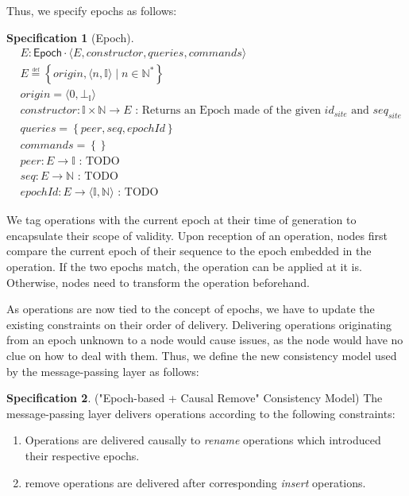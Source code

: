 \documentclass{article}
\newcommand{\commands}[1]{commands = \set{#1}}
\newcommand{\defeq}{\overset{\underset{\mathrm{def}}{}}{=}}
\newcommand{\fnspec}[3]{#1: #2 \text{ : #3}}
\newcommand{\queries}[1]{queries = \set{#1}}
\newcommand{\set}[1]{\left\{#1\right\}} %
\newcommand{\spectuple}[1]{\tuple{#1, constructor, queries, commands}}
\newcommand{\ssep}{\mid} %
\newcommand{\tuple}[1]{\langle #1 \rangle}
\theoremstyle{definition}
\newtheorem{specification}{Specification}
\begin{document}
Thus, we specify epochs as follows:

\begin{specification}[Epoch]
    \begin{align*}
    &E: \mathsf{Epoch} \cdot \spectuple{E}\\
    &E \defeq \set{origin, \tuple{n, \mathbb{I}} \ssep n \in \mathbb{N^*}}\\
    &origin = \tuple{0, \bot_{\mathbb{I}}}\\
    &\fnspec{constructor}{\mathbb{I} \times \mathbb{N} \to E}{Returns an Epoch made of the given $id_{site}$ and $seq_{site}$}\\
    &\queries{peer, seq, epochId}\\
    &\commands{}\\
    &\fnspec{peer}{E \to \mathbb{I}}{TODO}\\
    &\fnspec{seq}{E \to \mathbb{N}}{TODO}\\
    &\fnspec{epochId}{E \to \tuple{\mathbb{I}, \mathbb{N}}}{TODO}
    \end{align*}
    \label{spec:epoch}
\end{specification}

We tag operations with the current epoch at their time of generation to encapsulate their scope of validity.
Upon reception of an operation, nodes first compare the current epoch of their sequence to the epoch embedded in the operation.
If the two epochs match, the operation can be applied at it is.
Otherwise, nodes need to transform the operation beforehand.

As operations are now tied to the concept of epochs, we have to update the existing constraints on their order of delivery.
Delivering operations originating from an epoch unknown to a node would cause issues, as the node would have no clue on how to deal with them.
Thus, we define the new consistency model used by the message-passing layer as follows:

\begin{specification}("Epoch-based + Causal Remove" Consistency Model)
    The message-passing layer delivers operations according to the following constraints:
    \begin{enumerate}
        \item Operations are delivered causally to \emph{rename} operations which introduced their respective epochs.
        \item {remove} operations are delivered after corresponding \emph{insert} operations.
    \end{enumerate}
\end{specification}
\end{document}
